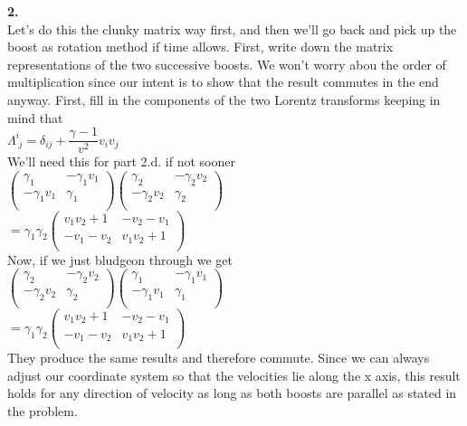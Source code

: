 \documentclass[prb,preprint]
{revtex4-1}
\begin{document}
\textbf{2.}
\\
Let's do this the clunky matrix way first, and then we'll go back and pick up the boost as rotation method if time allows.  First, write down the matrix representations of the two successive boosts.  We won't worry abou the order of multiplication since our intent is to show that the result commutes in the end anyway.  First, fill in the components of the two Lorentz transforms keeping in mind that 
\\
$\Lambda^i_{\; j} = \delta_{ij} + \dfrac{\gamma - 1}{v^2} v_i v_j$
\\
We'll need this for part 2.d. if not sooner
\\
$\begin{pmatrix}
\gamma_1 & -\gamma_1 v_1\\
-\gamma_1 v_1 & \gamma_1\\
\end{pmatrix} 
\begin{pmatrix}
\gamma_2 & -\gamma_2 v_2\\
-\gamma_2 v_2 & \gamma_2\\
\end{pmatrix} $
\\
$  = \gamma_1 \gamma_2 
\begin{pmatrix}
v_1 v_2 + 1 & -v_2 - v_1\\
-v_1 - v_2 & v_1 v_2 + 1\\
\end{pmatrix} $
\\
Now, if we just bludgeon through we get
\\
$\begin{pmatrix}
\gamma_2 & -\gamma_2 v_2\\
-\gamma_2 v_2 & \gamma_2\\
\end{pmatrix} 
\begin{pmatrix}
\gamma_1 & -\gamma_1 v_1\\
-\gamma_1 v_1 & \gamma_1\\
\end{pmatrix} $
\\
$  = \gamma_1 \gamma_2 
\begin{pmatrix}
v_1 v_2 + 1 & -v_2 - v_1\\
-v_1 - v_2 & v_1 v_2 + 1\\
\end{pmatrix} $
\\
They produce the same results and therefore commute.  Since we can always adjust our coordinate system so that the velocities lie along the x axis, this result holds for any direction of velocity as long as both boosts are parallel as stated in the problem.
\end{document}
